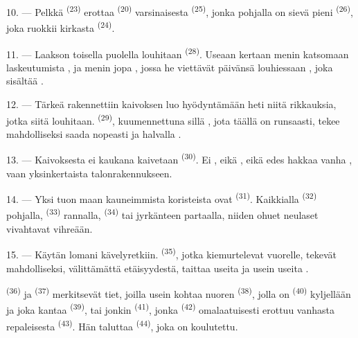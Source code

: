 10. --- Pelkkä  \textsuperscript{(23)} erottaa 
\textsuperscript{(20)} varsinaisesta  \textsuperscript{(25)},
jonka pohjalla on sievä pieni  \textsuperscript{(26)}, joka
ruokkii kirkasta  \textsuperscript{(24)}.

11. --- Laakson toisella puolella louhitaan 
\textsuperscript{(28)}. Useaan kertaan menin katsomaan 
laskeutumista , ja menin jopa , jossa he
viettävät päivänsä louhiessaan , joka sisältää
.

12. --- Tärkeä  rakennettiin kaivoksen luo hyödyntämään heti
niitä rikkauksia, jotka siitä louhitaan. 
\textsuperscript{(29)}, kuumennettuna sillä , jota täällä
on runsaasti, tekee mahdolliseksi saada nopeasti ja halvalla
.

13. --- Kaivoksesta ei kaukana kaivetaan 
\textsuperscript{(30)}. Ei , eikä , eikä
edes  hakkaa vanha 
, vaan yksinkertaista  talonrakennukseen.

14. --- Yksi tuon maan kauneimmista koristeista ovat 
\textsuperscript{(31)}. Kaikkialla  \textsuperscript{(32)}
pohjalla,  \textsuperscript{(33)} rannalla,
 \textsuperscript{(34)} tai jyrkänteen partaalla, niiden ohuet
neulaset vivahtavat vihreään.

\VUsaut{3.0mm}
\VUsaut{3.0mm}

15. --- Käytän lomani  kävelyretkiin. 
\textsuperscript{(35)}, jotka kiemurtelevat vuorelle, tekevät mahdolliseksi,
välittämättä etäisyydestä, taittaa useita  ja usein useita
.

 \textsuperscript{(36)} ja 
\textsuperscript{(37)} merkitsevät tiet, joilla usein kohtaa nuoren
 \textsuperscript{(38)}, jolla on 
\textsuperscript{(40)} kyljellään ja joka kantaa 
\textsuperscript{(39)}, tai jonkin  \textsuperscript{(41)},
jonka  \textsuperscript{(42)} omalaatuisesti erottuu vanhasta
repaleisesta  \textsuperscript{(43)}. Hän taluttaa
 \textsuperscript{(44)}, joka on koulutettu.

